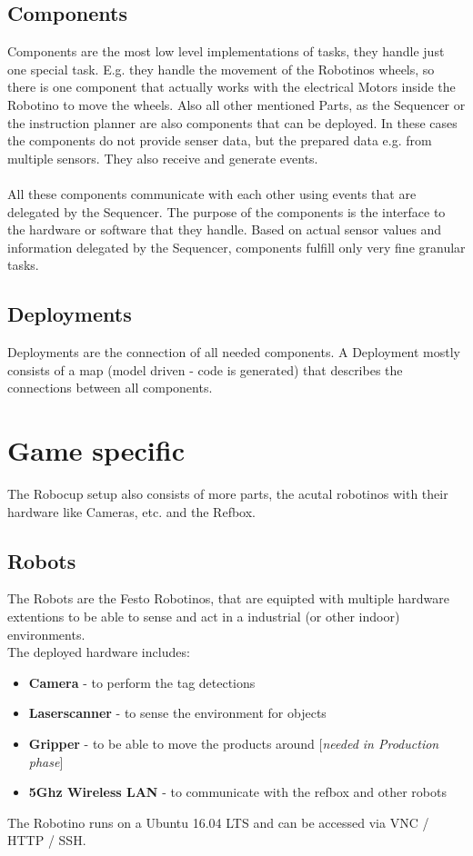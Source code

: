 \subsection{Components}
Components are the most low level implementations of tasks, they handle just one special task.
E.g. they handle the movement of the Robotinos wheels, so there is one component that actually
works with the electrical Motors inside the Robotino to move the wheels.
Also all other mentioned Parts, as the Sequencer or the instruction planner are also components
that can be deployed. In these cases the components do not provide senser data, but the prepared data
e.g. from multiple sensors. They also receive and generate events. \\
\\
All these components communicate with each other using events that are delegated by the Sequencer.
The purpose of the components is the interface to the hardware or software that they handle.
Based on actual sensor values and information delegated by the Sequencer, components fulfill only very fine granular tasks.

\subsection{Deployments}
Deployments are the connection of all needed components.
A Deployment mostly consists of a map (model driven - code is generated) that describes the connections between all components.

\section{Game specific}
The Robocup setup also consists of more parts, the acutal robotinos with their hardware like Cameras, etc. and the Refbox.
\subsection{Robots}
The Robots are the Festo Robotinos, that are equipted with multiple hardware extentions to be able to sense and act
in a industrial (or other indoor) environments.\\
The deployed hardware includes:
\begin{itemize}
    \item \textbf{Camera} - to perform the tag detections
    \item \textbf{Laserscanner} - to sense the environment for objects
    \item \textbf{Gripper} - to be able to move the products around [\textit{needed in Production phase}]
    \item \textbf{5Ghz Wireless LAN} - to communicate with the refbox and other robots
\end{itemize}
The Robotino runs on a Ubuntu 16.04 LTS and can be accessed via VNC / HTTP / SSH.\\

